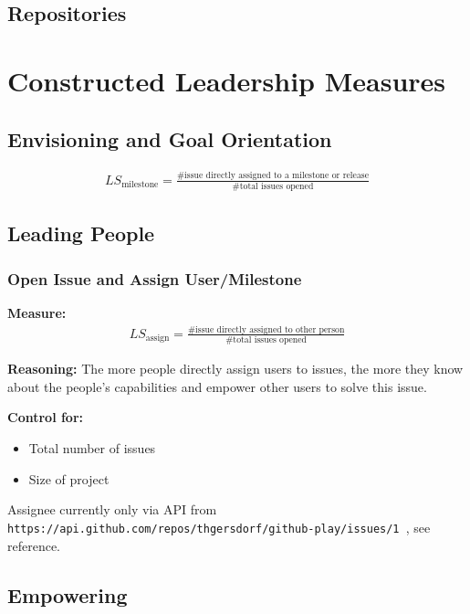 \documentclass[a4paper,10pt]{article}
\begin{document}
\subsection{Repositories}



\section{Constructed Leadership Measures}
\subsection{Envisioning and Goal Orientation}

\begin{align}
 LS_{\text{milestone}} = \frac{\text{\# issue directly assigned to a milestone or release}}{\text{\# total issues opened}} 
\end{align}




\subsection{Leading People}
\subsubsection{Open Issue and Assign  User/Milestone}

\textbf{Measure:}
\begin{align}
 LS_{\text{assign}} = \frac{\text{\# issue directly assigned to other person}}{\text{\# total issues opened}} 
\end{align}


\textbf{Reasoning:}
The more people directly assign users to issues, the more they know about the people's capabilities and empower other users to solve this issue.



\textbf{Control for:}
\begin{itemize}
 \item Total number of issues
\item Size of project
\end{itemize}



Assignee currently only via API from \texttt{ https://api.github.com/repos/thgersdorf/github-play/issues/1
}, see reference.



\subsection{Empowering}
\end{document}
